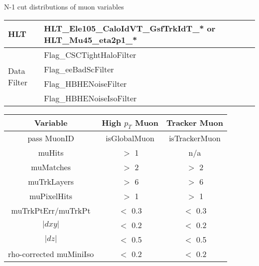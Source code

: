 \documentclass[7pt,aspectratio=1610]{beamer}
\begin{document}
\begin{frame}
  \justifying
  \LARGE{N-1 cut distributions of muon variables}
  \begin{tiny}
    \begin{center}
      \begin{tabular}[t]{ | l | l | }
        \hline
        HLT
        & HLT\_Ele105\_CaloIdVT\_GsfTrkIdT\_* or HLT\_Mu45\_eta2p1\_*  \\
        \hline
        \multirow{4}{*}{Data Filter}
        & Flag\_CSCTightHaloFilter                  \\
        & Flag\_eeBadScFilter                       \\
        & Flag\_HBHENoiseFilter                     \\
        & Flag\_HBHENoiseIsoFilter                  \\
        \hline
      \end{tabular}
    \end{center}
  \end{tiny}

  \begin{tiny}
    \begin{center}
      \begin{tabular}{ | c | c | c | }
        \hline
        \bf Variable & \bf High $p_T$ Muon & \bf Tracker Muon \\
        \hline
        pass MuonID             & isGlobalMuon & isTrackerMuon \\
        muHits                  & $>$ 1   & n/a   \\
        muMatches               & $>$ 2   & $>$ 2 \\
        muTrkLayers             & $>$ 6   & $>$ 6 \\
        muPixelHits             & $>$ 1   & $>$ 1 \\
        muTrkPtErr/muTrkPt      & $<$ 0.3 & $<$ 0.3 \\
        $|dxy|$                 & $<$ 0.2 & $<$ 0.2 \\
        $|dz|$                  & $<$ 0.5 & $<$ 0.5 \\
        rho-corrected muMiniIso & $<$ 0.2 & $<$ 0.2 \\
        \hline
      \end{tabular}
    \end{center}
  \end{tiny}
\end{frame}
\end{document}
